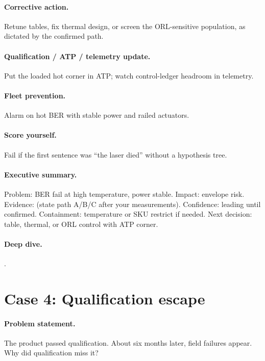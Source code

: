 \paragraph{Corrective action.}
Retune tables, fix thermal design, or screen the ORL-sensitive population, as
dictated by the confirmed path.

\paragraph{Qualification / ATP / telemetry update.}
Put the loaded hot corner in ATP; watch control-ledger headroom in telemetry.

\paragraph{Fleet prevention.}
Alarm on hot BER with stable power and railed actuators.

\paragraph{Score yourself.}
Fail if the first sentence was ``the laser died'' without a hypothesis tree.

\paragraph{Executive summary.}
Problem: BER fail at high temperature, power stable. Impact: envelope risk.
Evidence: (state path A/B/C after your measurements). Confidence: leading until
confirmed. Containment: temperature or SKU restrict if needed. Next decision:
table, thermal, or ORL control with ATP corner.

\paragraph{Deep dive.}
.

\section{Case 4: Qualification escape}
\label{sec:case-qual-escape}

\paragraph{Problem statement.}
The product passed qualification. About six months later, field failures
appear. Why did qualification miss it?

